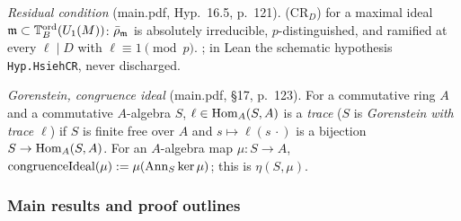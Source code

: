 \emph{Residual condition} (main.pdf, Hyp.~16.5, p.~121). (CR$_D$) for a maximal ideal $\mathfrak{m}\subset\mathbb{T}^{\mathrm{ord}}_B(U_1(M))$: $\bar\rho_{\mathfrak{m}}$ is
absolutely irreducible, $p$-distinguished, and ramified at every $\ell\mid D$ with $\ell\equiv1\pmod p$. \stcited{}
\cite[\S1.4, (CR,$\Sigma$), p.~4]{Hs}; in Lean the schematic hypothesis \texttt{Hyp.HsiehCR}, never discharged.

\emph{Gorenstein, congruence ideal} (main.pdf, \S17, p.~123). For a commutative ring $A$ and a commutative $A$-algebra $S$,
$\ell\in\operatorname{Hom}_A(S,A)$ is a \emph{trace} ($S$ is \emph{Gorenstein with trace $\ell$}) if $S$ is finite free over $A$ and
$s\mapsto\ell(s\,\cdot)$ is a bijection $S\to\operatorname{Hom}_A(S,A)$. For an $A$-algebra map $\mu:S\to A$,
$\mathrm{congruenceIdeal}(\mu):=\mu(\operatorname{Ann}_S\ker\mu)$; this is $\eta(S,\mu)$.

\subsubsection*{Main results and proof outlines}

